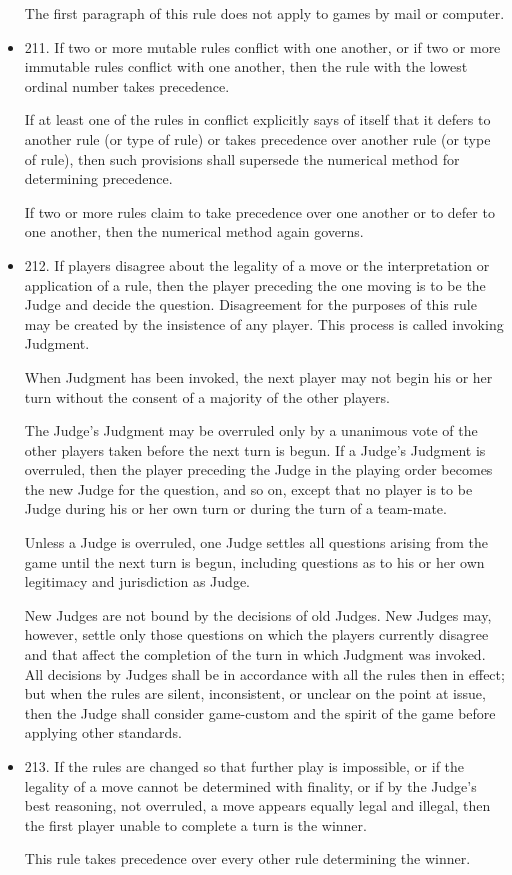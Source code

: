 \documentclass[11pt]{article}
\begin{document}
\begin{itemize}
     The first paragraph of this rule does not apply to games by mail
     or computer.
\item 211. If two or more mutable rules conflict with one another, or
     if two or more immutable rules conflict with one another, then
     the rule with the lowest ordinal number takes precedence.

     If at least one of the rules in conflict explicitly says of
     itself that it defers to another rule (or type of rule) or takes
     precedence over another rule (or type of rule), then such
     provisions shall supersede the numerical method for determining
     precedence.

     If two or more rules claim to take precedence over one another or
     to defer to one another, then the numerical method again governs.
\item 212. If players disagree about the legality of a move or the
     interpretation or application of a rule, then the player
     preceding the one moving is to be the Judge and decide the
     question. Disagreement for the purposes of this rule may be
     created by the insistence of any player. This process is called
     invoking Judgment.

     When Judgment has been invoked, the next player may not begin his
     or her turn without the consent of a majority of the other
     players.

     The Judge's Judgment may be overruled only by a unanimous vote of
     the other players taken before the next turn is begun. If a
     Judge's Judgment is overruled, then the player preceding the
     Judge in the playing order becomes the new Judge for the
     question, and so on, except that no player is to be Judge during
     his or her own turn or during the turn of a team-mate.

     Unless a Judge is overruled, one Judge settles all questions
     arising from the game until the next turn is begun, including
     questions as to his or her own legitimacy and jurisdiction as
     Judge.

     New Judges are not bound by the decisions of old Judges. New
     Judges may, however, settle only those questions on which the
     players currently disagree and that affect the completion of the
     turn in which Judgment was invoked. All decisions by Judges shall
     be in accordance with all the rules then in effect; but when the
     rules are silent, inconsistent, or unclear on the point at issue,
     then the Judge shall consider game-custom and the spirit of the
     game before applying other standards.
\item 213. If the rules are changed so that further play is impossible,
     or if the legality of a move cannot be determined with finality,
     or if by the Judge's best reasoning, not overruled, a move
     appears equally legal and illegal, then the first player unable
     to complete a turn is the winner.

     This rule takes precedence over every other rule determining the
     winner.
\end{itemize}
\end{document}
